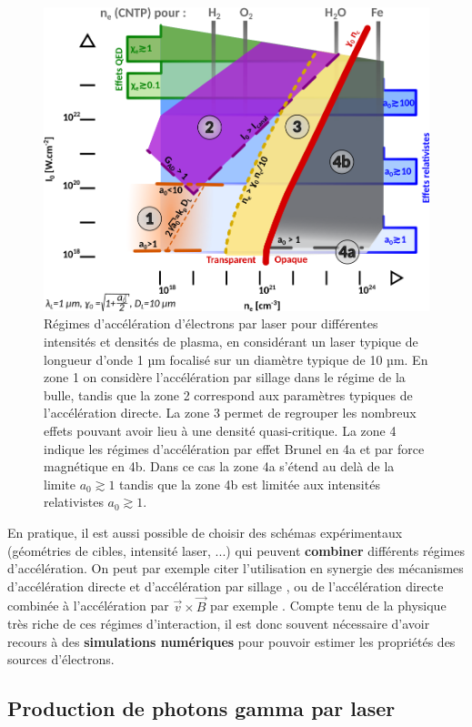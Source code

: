 \begin{refsection}
\begin{figure}[hbtp]
    \centering
    \includegraphics[width=0.8\linewidth]{2-laser/laser_electron_zones.png}
    \caption{Régimes d'accélération d'électrons par laser pour différentes intensités et densités de plasma, en considérant un laser typique de longueur d'onde 1 µm focalisé sur un diamètre typique de 10 µm. En zone 1 on considère l'accélération par sillage dans le régime de la bulle, tandis que la zone 2 correspond aux paramètres typiques de l'accélération directe. La zone 3 permet de regrouper les nombreux effets pouvant avoir lieu à une densité quasi-critique. La zone 4 indique les régimes d'accélération par effet Brunel en 4a et par force magnétique en 4b. Dans ce cas la zone 4a s'étend au delà de la limite $a_0 \gtrsim1$ tandis que la zone 4b est limitée aux intensités relativistes $a_0 \gtrsim 1$.}
    \label{fig:2-regimes_electron}
\end{figure}

En pratique, il est aussi possible de choisir des schémas expérimentaux (géométries de cibles, intensité laser, ...) qui peuvent \textbf{combiner} différents régimes d'accélération. On peut par exemple citer l'utilisation en synergie des mécanismes d'accélération directe et d'accélération par sillage \parencite{zhang_2015b}, ou de l'accélération directe combinée à l'accélération par $\vec{v} \times \vec{B}$ par exemple \parencite{krygier_2014, pazzaglia_2020, jiang_2014}. Compte tenu de la physique très riche de ces régimes d'interaction, il est donc souvent nécessaire d'avoir recours à des \textbf{simulations numériques} pour pouvoir estimer les propriétés des sources d'électrons.

\subsection{Production de photons gamma par laser}


\end{refsection}
